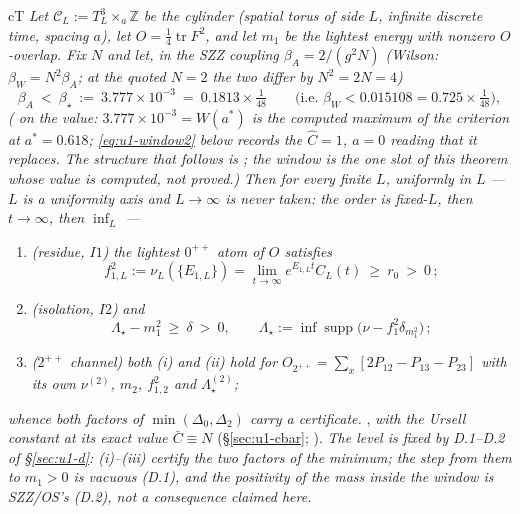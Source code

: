 \begin{claimbox}{cT}
 \emph{Let
$\mathcal C_L:=T^3_L\times_a\mathbb Z$ be the cylinder (spatial torus of side $L$, infinite
discrete time, spacing $a$), let $O=\tfrac14\operatorname{tr}F^2$, and let $m_1$ be the lightest
energy with nonzero $O$-overlap. Fix $N$ and let, in the SZZ coupling $\beta_A=2/(g^2N)$ (Wilson: $\beta_W=N^2\beta_A$; at the quoted $N=2$ the two differ by $N^2=2N=4$)}
\begin{equation}
\beta_A\ <\ \beta_\star\ :=\ 3.777\times10^{-3}\ =\ 0.1813\times\tfrac1{48}
\qquad\bigl(\text{i.e. }\beta_W<0.015108=0.725\times\tfrac1{48}\bigr),
\label{eq:u1-beta}
\end{equation}
\emph{(\LC{} on the value: $3.777\times10^{-3}=W(a^\ast)$ is the computed maximum of the
criterion at $a^\ast=0.618$; \eqref{eq:u1-window2} below records the $\hat C=1$, $a=0$ reading
that it replaces. The structure that follows is \LT{}; the window is the one slot of this
theorem whose value is computed, not proved.)}
\emph{Then for every finite $L$, \emph{uniformly} in $L$ --- $L$ is a uniformity axis and
$L\to\infty$ is never taken: the order is fixed-$L$, then $t\to\infty$, then $\inf_L$ ---}
\begin{enumerate}[label=(\roman*)]
\item \emph{(residue, $I1$)} \emph{the lightest $0^{++}$ atom of $O$ satisfies}
      \begin{equation}
      f_{1,L}^2:=\nu_L(\{E_{1,L}\})=\lim_{t\to\infty}e^{E_{1,L}t}C_L(t)\ \ge\ r_0\ >\ 0\,;
      \label{eq:u1-f1}
      \end{equation}
\item \emph{(isolation, $I2$)} \emph{and}
      \begin{equation}
      \Lambda_\star-m_1^2\ \ge\ \delta\ >\ 0,
      \qquad \Lambda_\star:=\inf\operatorname{supp}\bigl(\nu-f_1^2\delta_{m_1^2}\bigr)\,;
      \label{eq:u1-i2}
      \end{equation}
\item \emph{($2^{++}$ channel)} \emph{both (i) and (ii) hold for
      $O_{2^{++}}=\sum_x[2P_{12}-P_{13}-P_{23}]$ with its own $\nu^{(2)}$, $m_2$,
      $f_{1,2}^2$ and $\Lambda_\star^{(2)}$;}
\end{enumerate}
\emph{whence both factors of $\min(\Delta_0,\Delta_2)$ carry a certificate.} \LT{}, \emph{with the
Ursell constant at its exact value $\bar C\equiv N$} (\S\ref{sec:u1-cbar};
). \emph{The level is fixed by D.1--D.2 of \S\ref{sec:u1-d}: (i)--(iii)
certify the two \emph{factors} of the minimum; the step from them to $m_1>0$ is vacuous (D.1), and
the positivity of the mass inside the window is SZZ/OS's (D.2), not a consequence claimed here.}
\end{claimbox}

